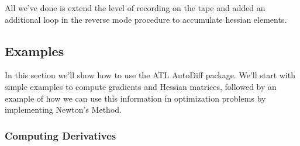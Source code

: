 \documentclass[12pt,a4paper]{article}
\begin{document}
\begin{algorithm*}[!htb]
 \end{algorithm*}

 All we've done is extend the level of recording on the tape and added an additional loop in the reverse mode procedure to accumulate hessian elements. 
\subsection{Examples}
In this section we'll show how to use the ATL AutoDiff package. We'll start with simple examples to compute gradients and Hessian matrices, followed by an example of how we can use this information in optimization problems by implementing Newton's Method. 
\subsubsection{Computing Derivatives}
\end{document}
